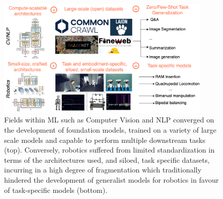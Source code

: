 \begin{figure}
    \centering
    \includegraphics[width=0.9\textwidth]{figures/ch5/ch5-ml-vs-robotics-foundation.png}
    \caption{Fields within ML such as Computer Vision and NLP converged on the development of foundation models, trained on a variety of large scale models and capable to perform multiple downstream tasks (top). Conversely, robotics suffered from limited standardization in terms of the architectures used, and siloed, task specific datasets, incurring in a high degree of fragmentation which traditionally hindered the development of generalist models for robotics in favour of task-specific models (bottom).}
    \label{fig:ch5-ml-vs-robotics-foundation}
\end{figure}

